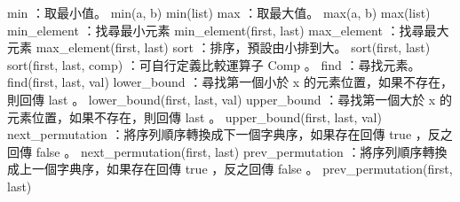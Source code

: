 \begin{itemize}
min ：取最小值。
min(a, b)
min(list)
max ：取最大值。
max(a, b)
max(list)
min_element ：找尋最小元素
min_element(first, last)
max_element ：找尋最大元素
max_element(first, last)
sort ：排序，預設由小排到大。
sort(first, last)
sort(first, last, comp) ：可自行定義比較運算子 Comp 。
find ：尋找元素。
find(first, last, val)
lower_bound ：尋找第一個小於 x 的元素位置，如果不存在，則回傳 last 。
lower_bound(first, last, val)
upper_bound ：尋找第一個大於 x 的元素位置，如果不存在，則回傳 last 。
upper_bound(first, last, val)
next_permutation ：將序列順序轉換成下一個字典序，如果存在回傳 true ，反之回傳 false 。
next_permutation(first, last)
prev_permutation ：將序列順序轉換成上一個字典序，如果存在回傳 true ，反之回傳 false 。
prev_permutation(first, last)
\end{itemize}